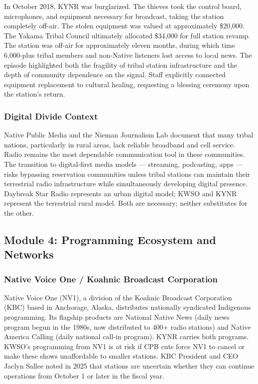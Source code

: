 \documentclass[11pt,letterpaper]{article}
\begin{document}
In October 2018, KYNR was burglarized. The thieves took the control board, microphones, and equipment necessary for broadcast, taking the station completely off-air. The stolen equipment was valued at approximately \$20,000. The Yakama Tribal Council ultimately allocated \$34,000 for full station revamp. The station was off-air for approximately eleven months, during which time 6,000-plus tribal members and non-Native listeners lost access to local news. The episode highlighted both the fragility of tribal station infrastructure and the depth of community dependence on the signal. Staff explicitly connected equipment replacement to cultural healing, requesting a blessing ceremony upon the station's return.

\subsubsection{Digital Divide Context}

Native Public Media and the Nieman Journalism Lab document that many tribal nations, particularly in rural areas, lack reliable broadband and cell service. Radio remains the most dependable communication tool in these communities. The transition to digital-first media models --- streaming, podcasting, apps --- risks bypassing reservation communities unless tribal stations can maintain their terrestrial radio infrastructure while simultaneously developing digital presence. Daybreak Star Radio represents an urban digital model; KWSO and KYNR represent the terrestrial rural model. Both are necessary; neither substitutes for the other.

\subsection{Module 4: Programming Ecosystem and Networks}

\subsubsection{Native Voice One / Koahnic Broadcast Corporation}

Native Voice One (NV1), a division of the Koahnic Broadcast Corporation (KBC) based in Anchorage, Alaska, distributes nationally syndicated Indigenous programming. Its flagship products are National Native News (daily news program begun in the 1980s, now distributed to 400+ radio stations) and Native America Calling (daily national call-in program). KYNR carries both programs. KWSO's programming from NV1 is at risk if CPB cuts force NV1 to cancel or make these shows unaffordable to smaller stations. KBC President and CEO Jaclyn Sallee noted in 2025 that stations are uncertain whether they can continue operations from October 1 or later in the fiscal year.
\end{document}
